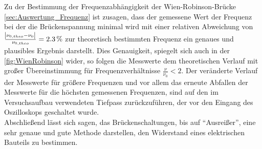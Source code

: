 Zu der Bestimmung der Frequenzabhängigkeit der Wien-Robinson-Brücke \cref{sec:Auswertung_Frequenz} ist zusagen, dass
der gemessene Wert der Frequenz bei der die Brückenspannung minimal wird mit einer relativen Abweichung 
von $\tfrac{\envert{\nu_{0,theo} - \nu_{0}}}{\nu_{0, theo}} = \SI{2.3}{\percent}$ zur theoretisch bestimmten 
Frequenz ein genaues und plausibles Ergebnis darstellt.
Dies Genauigkeit, spiegelt sich auch in der \cref{fig:WienRobinson} wider, so folgen die Messwerte dem 
theoretischen Verlauf mit großer Übereinstimmung für Frequenzverhältnisse $\frac{\nu}{\nu_{0}} < 2$. 
Der veränderte Verlauf der Messwerte für größere Frequenzen und vor allem das erneute Abfallen der Messwerte 
für die höchsten gemessenen Frequenzen, sind auf den im Versuchsaufbau verwendeten Tiefpass zurückzuführen,
der vor den Eingang des Oszilloskops geschaltet wurde.\\

Abschließend lässt sich sagen, das Brückenschaltungen, bis auf \enquote{Ausreißer}, eine sehr genaue und gute Methode
darstellen, den Widerstand eines elektrischen Bauteils zu bestimmen. 